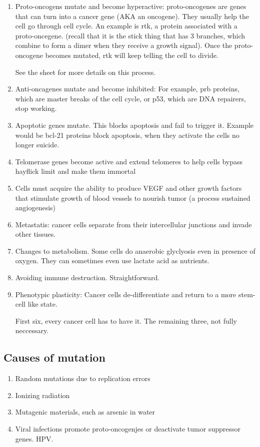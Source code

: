 \documentclass[12pt]{article}
\begin{document}
\begin{enumerate}
    \item Proto-oncogens mutate and become hyperactive: 
    proto-oncogenes are genes that can turn into a cancer gene (AKA
    an oncogene). They usually help the cell go through cell cycle. 
    An example is rtk, a protein associated with a proto-oncegene. (recall 
    that it is the stick thing that has 3 branches, which combine 
    to form a dimer when they receive a growth signal). Once the 
    proto-oncogene becomes mutated, rtk will keep telling the cell to divide.

    See the sheet for more details on this process. 
    \item Anti-oncagenes mutate and become inhibited: 
    For example, prb proteins, which are master breaks of the cell cycle, or p53,
    which are DNA repairers, 
    stop working.
    
    \item Apoptotic genes mutate. This blocks apoptosis and fail to trigger it.
    Example would be bcl-21 proteins block apoptosis, when they activate
    the cells no longer suicide. 
    \item Telomerase genes become active and extend telomeres to help cells
    bypass hayflick limit and make them immortal
    \item Cells must acquire the ability to produce VEGF and other growth 
    factors that stimulate growth of blood vessels to nourish tumor
    (a process sustained angiogenesis)
    \item Metastatis: cancer cells separate from their intercellular junctions
    and invade other tissues. 
    \item Changes to metabolism. Some cells do 
    anaerobic glyclyosis even in presence of oxygen. They can 
    sometimes even use lactate acid as nutrients. 
    \item Avoiding immune destruction. Straightforward.
    \item Phenotypic plasticity: 
    Cancer cells de-differentiate and return to a more stem-cell
    like state. 

    First six, every cancer cell has to have it. The remaining three,
    not fully neccessary. 
\end{enumerate}

\subsection{Causes of mutation}
\begin{enumerate}
    \item Random mutations due to replication errors
    \item Ionizing radiation
    \item Mutagenic materials, such as arsenic in water
    \item Viral infections promote proto-oncogenjes or 
    deactivate tumor suppressor genes. HPV. 
\end{enumerate}
\end{document}
